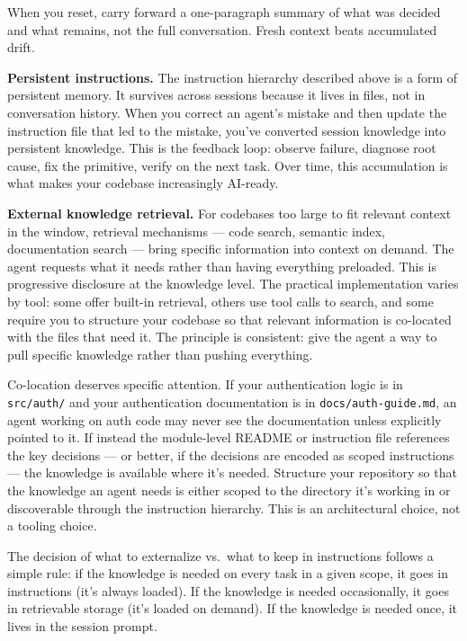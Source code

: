 \documentclass[
  a4paper,
  DIV=11,
  numbers=noendperiod]{scrreprt}
\begin{document}
When you reset, carry forward a one-paragraph summary of what was
decided and what remains, not the full conversation. Fresh context beats
accumulated drift.

\textbf{Persistent instructions.} The instruction hierarchy described
above is a form of persistent memory. It survives across sessions
because it lives in files, not in conversation history. When you correct
an agent's mistake and then update the instruction file that led to the
mistake, you've converted session knowledge into persistent knowledge.
This is the feedback loop: observe failure, diagnose root cause, fix the
primitive, verify on the next task. Over time, this accumulation is what
makes your codebase increasingly AI-ready.

\textbf{External knowledge retrieval.} For codebases too large to fit
relevant context in the window, retrieval mechanisms --- code search,
semantic index, documentation search --- bring specific information into
context on demand. The agent requests what it needs rather than having
everything preloaded. This is progressive disclosure at the knowledge
level. The practical implementation varies by tool: some offer built-in
retrieval, others use tool calls to search, and some require you to
structure your codebase so that relevant information is co-located with
the files that need it. The principle is consistent: give the agent a
way to pull specific knowledge rather than pushing everything.

Co-location deserves specific attention. If your authentication logic is
in \texttt{src/auth/} and your authentication documentation is in
\texttt{docs/auth-guide.md}, an agent working on auth code may never see
the documentation unless explicitly pointed to it. If instead the
module-level README or instruction file references the key decisions ---
or better, if the decisions are encoded as scoped instructions --- the
knowledge is available where it's needed. Structure your repository so
that the knowledge an agent needs is either scoped to the directory it's
working in or discoverable through the instruction hierarchy. This is an
architectural choice, not a tooling choice.

The decision of what to externalize vs.~what to keep in instructions
follows a simple rule: if the knowledge is needed on every task in a
given scope, it goes in instructions (it's always loaded). If the
knowledge is needed occasionally, it goes in retrievable storage (it's
loaded on demand). If the knowledge is needed once, it lives in the
session prompt.
\end{document}
